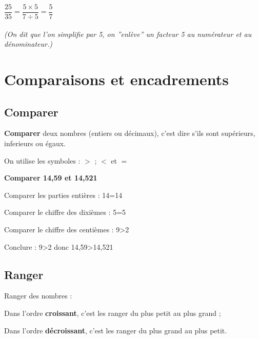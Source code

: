 \documentclass[11pt]{article}
\begin{document}
\begin{exemple}
$\dfrac{25}{35}=\dfrac{5 \times 5}{7 \div 5}=\dfrac{5}{7}$ \\ \\
\textit{(On dit que l'on simplifie par 5, on ''enlève'' un facteur 5
au numérateur et au dénominateur.)}
\end{exemple}

\section{Comparaisons et encadrements}

\subsection{Comparer}
\begin{definition}
\textbf{Comparer} deux nombres (entiers ou décimaux), c'est dire s'ils sont supérieurs, inferieurs ou égaux.
\end{definition}

\begin{remarque}
On utilise les symboles : $>$ ; $<$ et $=$
\end{remarque}
\newpage
\begin{exercice}
\textbf{Comparer 14,59 et 14,521}
\begin{enu}
\item Comparer les parties entières : 14=14
\item Comparer le chiffre des dixièmes : 5=5
\item Comparer le chiffre des centièmes : 9>2
\item Conclure : 9>2 donc 14,59>14,521
\end{enu}
\end{exercice}

\subsection{Ranger}
\begin{definition}
  Ranger des nombres :
  \begin{enu}
  \item Dans l'ordre \textbf{croissant}, c'est les ranger du plus
    petit au plus grand ;
  \item Dans l'ordre \textbf{décroissant}, c'est les ranger du plus
    grand au plus petit.
  \end{enu}
\end{definition}
\end{document}
